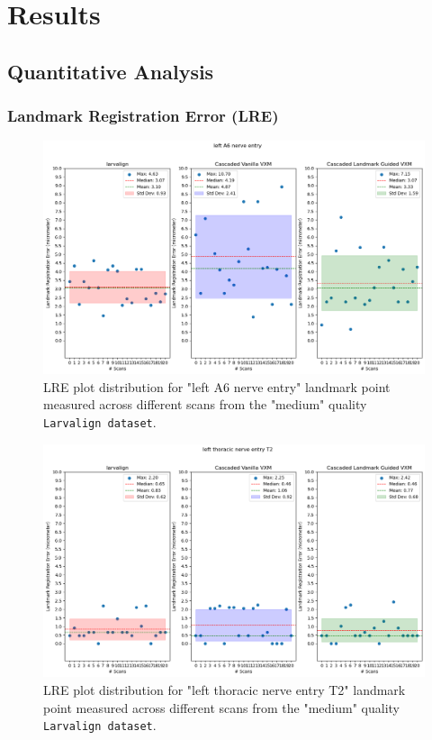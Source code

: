 \documentclass{book}
\begin{document}
	\newpage
	\listoffigures %
	\listoftables
	\lstlistoflistings %
	
	\appendix
	\chapter{Results}
	\section{Quantitative Analysis}
	\subsection{Landmark Registration Error (LRE)}	
	\begin{figure}[h]
		\centering
		\includegraphics[width=0.75\columnwidth]{resources/chapter5_fresh/output/left A6 nerve entry.png}
		\caption{LRE plot distribution for "left A6 nerve entry" landmark point measured across different scans from the "medium" quality \texttt{Larvalign dataset}.}
		\label{fig:landmark1}
	\end{figure}
	
	\begin{figure}[h]
		\centering
		\includegraphics[width=0.75\columnwidth]{resources/chapter5_fresh/output/left thoracic nerve entry T2.png}
		\caption{LRE plot distribution for "left thoracic nerve entry T2" landmark point measured across different scans from the "medium" quality \texttt{Larvalign dataset}.}
		\label{fig:landmark2}
	\end{figure}
	
\end{document}
